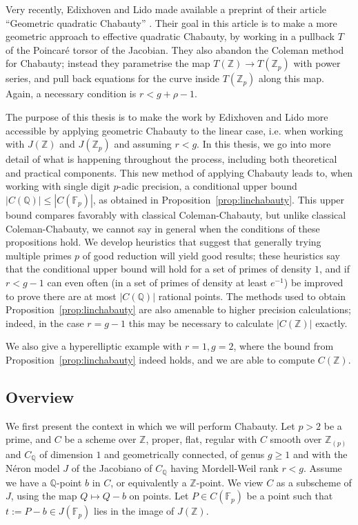 \documentclass[12pt]{article}
\newcommand{\Z}{\mathbb{Z}}
\newcommand{\Q}{\mathbb{Q}}
\newcommand{\F}{\mathbb{F}}
\theoremstyle{plain}
\theoremstyle{definition}
\theoremstyle{remark}
\begin{document}
Very recently, Edixhoven and Lido made available a preprint of their article ``Geometric quadratic Chabauty'' \cite{edixhoven20}. Their goal in this article is to make a more geometric approach to effective quadratic Chabauty, by working in a pullback $T$ of the Poincar\'e torsor of the Jacobian. They also abandon the Coleman method for Chabauty; instead they parametrise the map $T(\Z) \to T(\Z_p)$ with power series, and pull back equations for the curve inside $T(\Z_p)$ along this map. Again, a necessary condition is $r < g + \rho - 1$.

The purpose of this thesis is to make the work by Edixhoven and Lido more accessible by applying geometric Chabauty to the linear case, i.e. when working with $J(\Z)$ and $J(\Z_p)$ and assuming $r < g$. In this thesis, we go into more detail of what is happening throughout the process, including both theoretical and practical components. This new method of applying Chabauty leads to, when working with single digit $p$-adic precision, a conditional upper bound $|C(\Q)| \leq |C(\F_p)|$, as obtained in Proposition~\ref{prop:linchabauty}. This upper bound compares favorably with classical Coleman-Chabauty, but unlike classical Coleman-Chabauty, we cannot say in general when the conditions of these propositions hold. We develop heuristics that suggest that generally trying multiple primes $p$ of good reduction will yield good results; these heuristics say that the conditional upper bound will hold for a set of primes of density $1$, and if $r < g-1$ can even often (in a set of primes of density at least $e^{-1}$) be improved to prove there are at most $|C(\Q)|$ rational points. The methods used to obtain Proposition~\ref{prop:linchabauty} are also amenable to higher precision calculations; indeed, in the case $r = g-1$ this may be necessary to calculate $|C(\Z)|$ exactly.

We also give a hyperelliptic example with $r = 1, g = 2$, where the bound from Proposition~\ref{prop:linchabauty} indeed holds, and we are able to compute $C(\Z)$.

\subsection{Overview}
We first present the context in which we will perform Chabauty. Let $p>2$ be a prime, and $C$ be a scheme over $\Z$, proper, flat, regular with $C$ smooth over $\Z_{(p)}$ and $C_\Q$ of dimension $1$ and geometrically connected, of genus $g \geq 1$ and with the N\'eron model $J$ of the Jacobiano of $C_\Q$ having Mordell-Weil rank $r < g$. Assume we have a $\Q$-point $b$ in $C$, or equivalently a $\Z$-point. We view $C$ as a subscheme of $J$, using the map $Q \mapsto Q - b$ on points. Let $P \in C(\F_p)$ be a point such that $t := P - b \in J(\F_p)$ lies in the image of $J(\Z)$.
\end{document}
